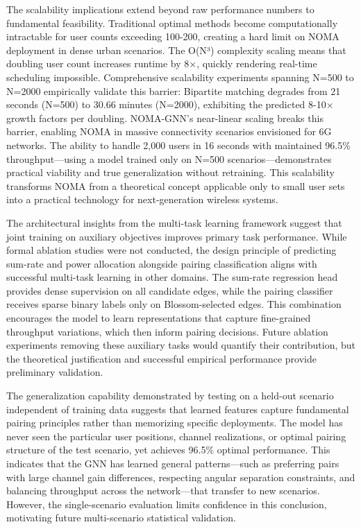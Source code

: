 The scalability implications extend beyond raw performance numbers to fundamental feasibility. Traditional optimal methods become computationally intractable for user counts exceeding 100-200, creating a hard limit on NOMA deployment in dense urban scenarios. The O(N³) complexity scaling means that doubling user count increases runtime by 8×, quickly rendering real-time scheduling impossible. Comprehensive scalability experiments spanning N=500 to N=2000 empirically validate this barrier: Bipartite matching degrades from 21 seconds (N=500) to 30.66 minutes (N=2000), exhibiting the predicted 8-10× growth factors per doubling. NOMA-GNN's near-linear scaling breaks this barrier, enabling NOMA in massive connectivity scenarios envisioned for 6G networks. The ability to handle 2,000 users in 16 seconds with maintained 96.5\% throughput—using a model trained only on N=500 scenarios—demonstrates practical viability and true generalization without retraining. This scalability transforms NOMA from a theoretical concept applicable only to small user sets into a practical technology for next-generation wireless systems.

The architectural insights from the multi-task learning framework suggest that joint training on auxiliary objectives improves primary task performance. While formal ablation studies were not conducted, the design principle of predicting sum-rate and power allocation alongside pairing classification aligns with successful multi-task learning in other domains. The sum-rate regression head provides dense supervision on all candidate edges, while the pairing classifier receives sparse binary labels only on Blossom-selected edges. This combination encourages the model to learn representations that capture fine-grained throughput variations, which then inform pairing decisions. Future ablation experiments removing these auxiliary tasks would quantify their contribution, but the theoretical justification and successful empirical performance provide preliminary validation.

The generalization capability demonstrated by testing on a held-out scenario independent of training data suggests that learned features capture fundamental pairing principles rather than memorizing specific deployments. The model has never seen the particular user positions, channel realizations, or optimal pairing structure of the test scenario, yet achieves 96.5\% optimal performance. This indicates that the GNN has learned general patterns—such as preferring pairs with large channel gain differences, respecting angular separation constraints, and balancing throughput across the network—that transfer to new scenarios. However, the single-scenario evaluation limits confidence in this conclusion, motivating future multi-scenario statistical validation.

